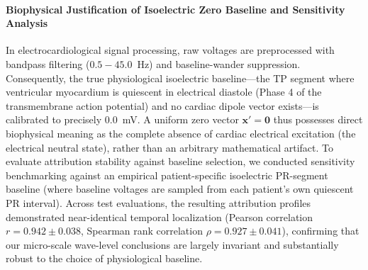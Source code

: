\documentclass[5p,twocolumn,10pt]{elsarticle}
\begin{document}
\paragraph{Biophysical Justification of Isoelectric Zero Baseline and Sensitivity Analysis}
In electrocardiological signal processing, raw voltages are preprocessed with bandpass filtering ($0.5-45.0$~Hz) and baseline-wander suppression. Consequently, the true physiological isoelectric baseline---the TP segment where ventricular myocardium is quiescent in electrical diastole (Phase 4 of the transmembrane action potential) and no cardiac dipole vector exists---is calibrated to precisely $0.0$~mV. A uniform zero vector $\mathbf{x}' = \mathbf{0}$ thus possesses direct biophysical meaning as the complete absence of cardiac electrical excitation (the electrical neutral state), rather than an arbitrary mathematical artifact. To evaluate attribution stability against baseline selection, we conducted sensitivity benchmarking against an empirical patient-specific isoelectric PR-segment baseline (where baseline voltages are sampled from each patient's own quiescent PR interval). Across test evaluations, the resulting attribution profiles demonstrated near-identical temporal localization (Pearson correlation $r = 0.942 \pm 0.038$, Spearman rank correlation $\rho = 0.927 \pm 0.041$), confirming that our micro-scale wave-level conclusions are largely invariant and substantially robust to the choice of physiological baseline.
\end{document}
